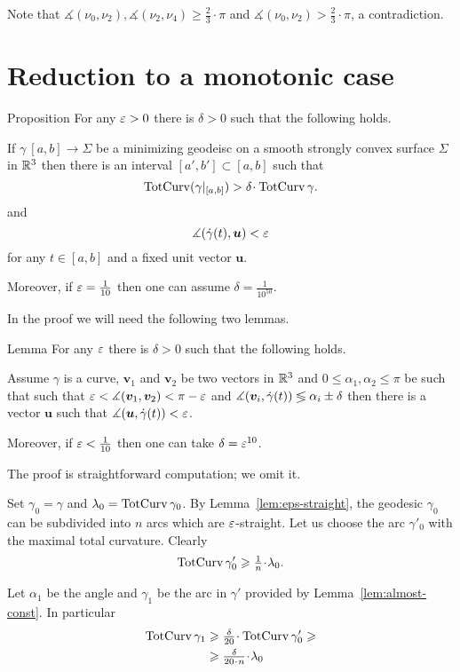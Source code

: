 \documentclass[a4paper,10pt]{amsart}
\begin{document}
Note that $\measuredangle(\nu_0,\nu_2), \measuredangle(\nu_2,\nu_4)\ge\tfrac23\cdot\pi$ and $\measuredangle(\nu_0,\nu_2)>\tfrac23\cdot\pi$,
a contradiction.
\qeds



\section{Reduction to a monotonic case}

\begin{thm}{Proposition}\label{prop:almost-const}
For any $\varepsilon>0$ there is $\delta>0$ such that the following holds.

If $\gamma\:[a,b]\to\Sigma$ be a minimizing geodeisc 
on a smooth strongly convex surface $\Sigma$ in $\mathbb{R}^3$
then there is an interval $[a',b']\subset[a,b]$
such that 
\[\tc(\gamma|_{[a,b]})>\delta\cdot\tc\gamma.\]
and 
\[\measuredangle(\dot\gamma(t),\bm{u})<\varepsilon\] 
for any $t\in[a,b]$
and a fixed unit vector $\bm{u}$.

Moreover, if $\varepsilon=\tfrac1{10}$ then one can assume $\delta=\tfrac1{10^{50}}$.
\end{thm}

In the proof we will need the following two lemmas.

\begin{thm}{Lemma}
For any $\varepsilon$ there is $\delta>0$ such that the following holds.

Assume $\gamma$ is a curve,
$\bm{v}_1$ and $\bm{v}_2$  be two vectors in $\mathbb{R}^3$
and $0\le\alpha_1,\alpha_2\le\pi$ be such that
such that $\varepsilon<\measuredangle(\bm{v}_1,\bm{v}_2)<\pi-\varepsilon$ and
$\measuredangle(\bm{v}_i,\dot\gamma(t))\lessgtr\alpha_i\pm\delta$
then there is a vector $\bm{u}$ such that
$\measuredangle(\bm{u},\dot\gamma(t))<\varepsilon$.

Moreover, if $\varepsilon<\tfrac1{10}$ then one can take $\delta=\varepsilon^{10}$.
\end{thm}

The proof is straightforward computation;
we omit it.

Set $\gamma_0=\gamma$ and $\lambda_0=\mathop{\rm TotCurv}\nolimits\gamma_0$.
By Lemma~\ref{lem:eps-straight}, the geodesic $\gamma_0$ can be subdivided into $n$ arcs which are  $\varepsilon$-straight.
Let us choose the arc $\gamma'_0$ with the maximal total curvature.
Clearly 
\[\tc\gamma'_0\ge\tfrac1{n}\cdot\lambda_0.\]

Let $\alpha_1$ be the angle
and $\gamma_1$ be the arc in $\gamma'$ 
provided by Lemma~\ref{lem:almost-const}.
In particular 
\begin{align*}
\tc\gamma_1&\ge\tfrac{\delta}{20}\cdot\tc\gamma'_0
\ge
\\
&\ge \tfrac{\delta}{20\cdot n}\cdot\lambda_0
\end{align*}
\end{document}
